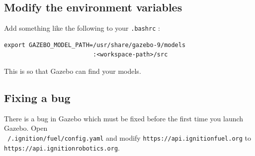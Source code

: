 \documentclass{article}
\begin{document}
        \subsection{Modify the environment variables}
            Add something like the following to your \texttt{.bashrc} :
            \begin{verbatim}
export GAZEBO_MODEL_PATH=/usr/share/gazebo-9/models
                         :<workspace-path>/src                
            \end{verbatim}
            This is so that Gazebo can find your models.
        \subsection{Fixing a bug}
            There is a bug in Gazebo which must be fixed before the first time you launch Gazebo. Open\\  
            \texttt{~/.ignition/fuel/config.yaml} and modify \texttt{https://api.ignitionfuel.org} to \\
            \texttt{https://api.ignitionrobotics.org}.
    \newpage 
\end{document}
